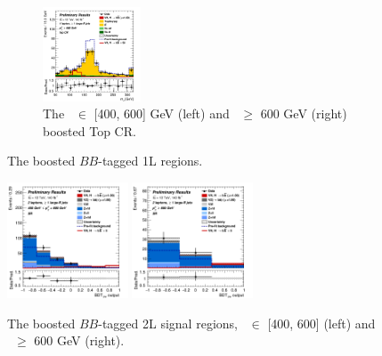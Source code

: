 \begin{figure}[h!]
\begin{subfigure}[b]{\textwidth}
        \includegraphics[width=0.32\textwidth]{Images/VH/Own_fit/postfit_VHbb/Region_distmBB_BMin600_incFat1_Fat1_DSRtopaddbjetcr_J0_TTypebb_incJet1_T2_L1_Y6051_GlobalFit_conditionnal_mu1.png}
        \caption{The \ptv\ $\in$ [400, 600] GeV (left) and \ptv\ $\geq$ 600 GeV (right) boosted Top CR.}
        \label{fig:plots_VHbbBoost_1L_topCR}
    \end{subfigure}
    \caption{The boosted $BB$-tagged 1L regions.}
    \label{fig:plots_VHbbBoost_1L}
\end{figure} 


\begin{figure}[h!]
    \centering
    \includegraphics[width=0.32\textwidth]{Images/VH/Own_fit/postfit_VHbb/Region_distmva_BMax600_BMin400_incFat1_Fat1_DSR_J0_TTypebb_incJet1_T2_L2_Y6051_GlobalFit_conditionnal_mu1.png}
    \includegraphics[width=0.32\textwidth]{Images/VH/Own_fit/postfit_VHbb/Region_distmva_BMin600_incFat1_Fat1_DSR_J0_TTypebb_incJet1_T2_L2_Y6051_GlobalFit_conditionnal_mu1.png}
    \caption{The boosted $BB$-tagged 2L signal regions, \ptv\ $\in$ [400, 600] (left) and \ptv\ $\geq$ 600 GeV (right).}
    \label{fig:plots_VHbbBoost_2L_SR}
\end{figure} 
\vspace*{\fill}